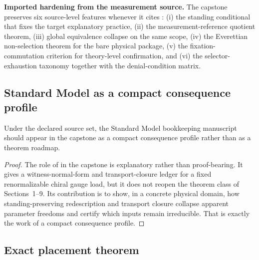 \begin{reviewbox}
\textbf{Imported hardening from the measurement source.} The capstone preserves six source-level features whenever it cites \measurementdoc{}: (i) the standing conditional that fixes the target explanatory practice, (ii) the measurement-reference quotient theorem, (iii) global equivalence collapse on the same scope, (iv) the Everettian non-selection theorem for the bare physical package, (v) the fixation-commutation criterion for theory-level confirmation, and (vi) the selector-exhaustion taxonomy together with the denial-condition matrix.\cite{MaleyMeasurement}
\end{reviewbox}

\subsection{Standard Model as a compact consequence profile}

\begin{proposition}
Under the declared source set, the Standard Model bookkeeping manuscript should appear in the capstone as a compact consequence profile rather than as a theorem roadmap.
\end{proposition}

\begin{proof}
The role of \structuradoc{} in the capstone is explanatory rather than proof-bearing. It gives a witness-normal-form and transport-closure ledger for a fixed renormalizable chiral gauge load, but it does not reopen the theorem class of Sections~1--9. Its contribution is to show, in a concrete physical domain, how standing-preserving redescription and transport closure collapse apparent parameter freedoms and certify which inputs remain irreducible. That is exactly the work of a compact consequence profile.\cite{MaleyStructura}
\end{proof}

\subsection{Exact placement theorem}

